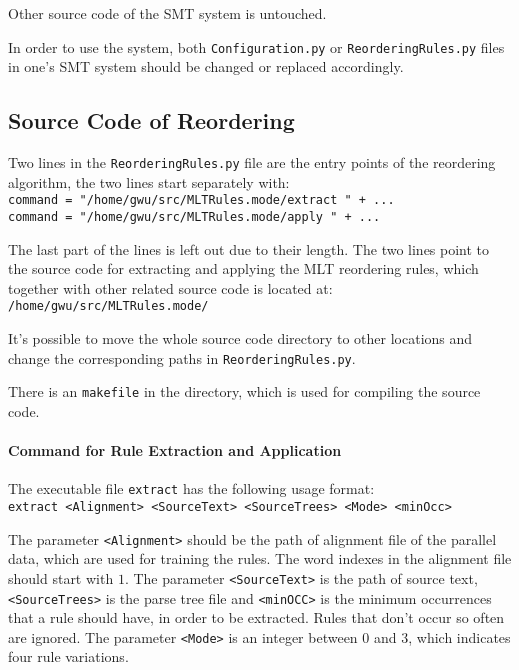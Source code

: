 Other source code of the SMT system is untouched.

In order to use the system, both \verb|Configuration.py| or \verb|ReorderingRules.py| files in one's SMT system should be changed or replaced accordingly.

\subsection{Source Code of Reordering}

Two lines in the \verb|ReorderingRules.py| file are the entry points of the reordering algorithm, the two lines start separately with:\\
\verb|command = "/home/gwu/src/MLTRules.mode/extract " + ...|\\
\verb|command = "/home/gwu/src/MLTRules.mode/apply " + ...|

The last part of the lines is left out due to their length. The two lines point to the source code for extracting and applying the MLT reordering rules, which together with other related source code is located at:\\
\verb|/home/gwu/src/MLTRules.mode/|

It's possible to move the whole source code directory to other locations and change the corresponding paths in \verb|ReorderingRules.py|.

There is an \verb|makefile| in the directory, which is used for compiling the source code.

\paragraph{Command for Rule Extraction and Application}

The executable file \verb|extract| has the following usage format:\\ \verb|extract <Alignment> <SourceText> <SourceTrees> <Mode> <minOcc>|

The parameter \verb|<Alignment>| should be the path of alignment file of the parallel data, which are used for training the rules. The word indexes in the alignment file should start with $1$. The parameter \verb|<SourceText>| is the path of source text, \verb|<SourceTrees>| is the parse tree file and \verb|<minOCC>| is the minimum occurrences that a rule should have, in order to be extracted. Rules that don't occur so often are ignored. The parameter \verb|<Mode>| is an integer between $0$ and $3$, which indicates four rule variations.

